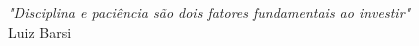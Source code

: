 \begin{epigrafe}
    \vspace*{\fill}
	\begin{flushright}
		\textit{"Disciplina e paciência são dois fatores fundamentais ao investir"}\\Luiz Barsi
	\end{flushright}
\end{epigrafe}